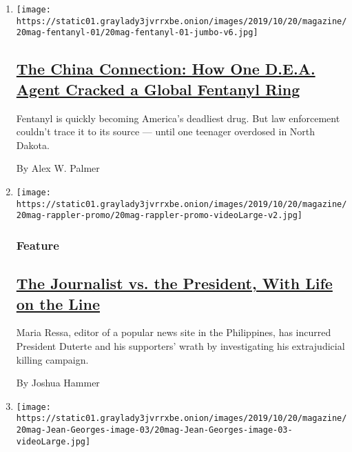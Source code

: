 \begin{enumerate}
\def\labelenumi{\arabic{enumi}.}
\item
  \texttt{[image: https://static01.graylady3jvrrxbe.onion/images/2019/10/20/magazine/20mag-fentanyl-01/20mag-fentanyl-01-jumbo-v6.jpg]}

  \hypertarget{the-china-connection-how-one-dea-agent-cracked-a-global-fentanyl-ring}{%
  \subsection{\texorpdfstring{\href{/2019/10/16/magazine/china-fentanyl-drug-ring.html}{The
  China Connection: How One D.E.A. Agent Cracked a Global Fentanyl
  Ring}}{The China Connection: How One D.E.A. Agent Cracked a Global Fentanyl Ring}}\label{the-china-connection-how-one-dea-agent-cracked-a-global-fentanyl-ring}}

  Fentanyl is quickly becoming America's deadliest drug. But law
  enforcement couldn't trace it to its source --- until one teenager
  overdosed in North Dakota.

  By Alex W. Palmer
\item
  \texttt{[image: https://static01.graylady3jvrrxbe.onion/images/2019/10/20/magazine/20mag-rappler-promo/20mag-rappler-promo-videoLarge-v2.jpg]}

  \hypertarget{feature}{%
  \subsubsection{Feature}\label{feature}}

  \hypertarget{the-journalist-vs-the-president-with-life-on-the-line}{%
  \subsection{\texorpdfstring{\href{/2019/10/15/magazine/rappler-philippines-maria-ressa.html}{The
  Journalist vs. the President, With Life on the
  Line}}{The Journalist vs. the President, With Life on the Line}}\label{the-journalist-vs-the-president-with-life-on-the-line}}

  Maria Ressa, editor of a popular news site in the Philippines, has
  incurred President Duterte and his supporters' wrath by investigating
  his extrajudicial killing campaign.

  By Joshua Hammer
\item
  \texttt{[image: https://static01.graylady3jvrrxbe.onion/images/2019/10/20/magazine/20mag-Jean-Georges-image-03/20mag-Jean-Georges-image-03-videoLarge.jpg]}


\end{enumerate}
